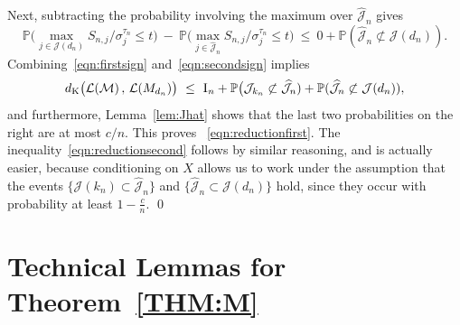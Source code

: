\documentclass[aos,preprint]{imsart}
\numberwithin{equation}{section}
\theoremstyle{plain}
\newcommand{\M}{\mathcal{M}}
\renewcommand{\hat}[1]{\widehat{#1}}
\newcommand{\I}{\textsc{I}}
\newcommand{\J}{\mathcal{J}}
\renewcommand{\P}{\mathbb{P}}
\renewcommand{\L}{\mathcal{L}}
\newcommand{\1}{{\bf{1}}}
\newcommand{\0}{\mathbf{0}}
\begin{document}
\normalsize
 Next, subtracting the probability involving the maximum over $\hat\J_n$ gives
\footnotesize
\begin{equation}\label{eqn:secondsign}
\P\Big(\max_{j\in\J(d_n)}S_{n,j}/\sigma_j^{\tau_n}\leq t\Big) 
 \   - \ \P\Big(\max_{j\in\hat\J_n}S_{n,j}/\sigma_j^{\tau_n}\leq t\Big) \ \leq \ 0 + \P(\hat\J_n\not \subset\J(d_n)).
\end{equation}
\normalsize
Combining~\eqref{eqn:firstsign} and~\eqref{eqn:secondsign} implies
\begin{equation*}
d_{\textup{K}}\big(\L(\M)\, ,\, \L(M_{d_n})\big) \ \leq  \ \I_n+\P\big(\J_{k_n}\not\subset\hat\J_n)+\P(\hat\J_n\not \subset\J(d_n)),
\end{equation*}
and furthermore, Lemma~\ref{lem:Jhat} shows that the last two probabilities on the right are at most $c/n$. This proves ~\eqref{eqn:reductionfirst}. The inequality~\eqref{eqn:reductionsecond} follows by similar reasoning, and is actually easier, because conditioning on $X$ allows us to work under the assumption that the events $\{\J(k_n)\subset \hat\J_n\}$ and $\{\hat\J_n\subset\J(d_n)\}$ hold, since they occur with probability at least $1-\frac cn$. \qed

%
%
%
%
%
%
%
%
%
%
%
%
%

\section{Technical Lemmas for Theorem~\ref{THM:M}}\label{app:lemmamult}
\end{document}
